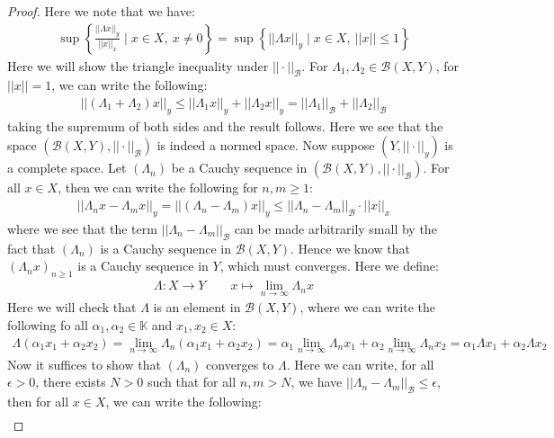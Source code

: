 \documentclass[11pt]{book}
\theoremstyle{break}
\theoremstyle{break}
\begin{document}
\begin{proof}
Here we note that we have:
\begin{align*}
\sup\left\{\frac{||\Lambda x||_y}{||x||_x}\mid x \in X, \ x\neq 0 \right\}  = \sup\left\{||\Lambda x||_y\mid x \in X, \ ||x||\leq 1 \right\}
\end{align*}
Here we will show the triangle inequality under $||\cdot ||_{\mathcal{B}}$. For $\Lambda_1, \Lambda_2 \in \mathcal{B}(X,Y)$, for $||x||=1$, we can write the following:
\begin{align*}
||(\Lambda_1+\Lambda_2)x||_y \leq ||\Lambda_1 x||_y + ||\Lambda_2 x||_y  = ||\Lambda_1||_{\mathcal{B}} + ||\Lambda_2||_{\mathcal{B}}
\end{align*}
taking the supremum of both sides and the result follows. Here we see that the space $(\mathcal{B}(X,Y), ||\cdot ||_{\mathcal{B}})$ is indeed a normed space. Now suppose $(Y, ||\cdot ||_y)$ is a complete space. Let $(\Lambda_n)$ be a Cauchy sequence in $(\mathcal{B}(X,Y), ||\cdot ||_{\mathcal{B}})$. For all $x \in X$, then we can write the following for $n,m \geq 1$:
\begin{align*}
||\Lambda_n x - \Lambda_m x||_y  = ||(\Lambda_n - \Lambda_m) x||_y \leq ||\Lambda_n - \Lambda_m||_{\mathcal{B}} \cdot ||x||_x
\end{align*}
where we see that the term $||\Lambda_n - \Lambda_m||_{\mathcal{B}}$ can be made arbitrarily small by the fact that $(\Lambda_n)$ is a Cauchy sequence in $\mathcal{B}(X,Y)$. Hence we know that $(\Lambda_n x)_{n \geq 1}$ is a Cauchy sequence in $Y$, which must converges. Here we define:
\begin{align*}
\Lambda:X \to Y \qquad x\mapsto \lim_{n\to \infty}\Lambda_n x
\end{align*} 
Here we will check that $\Lambda$ is an element in $\mathcal{B}(X,Y)$, where we can write the following fo all $\alpha_1 ,\alpha_2 \in \mathbb{K}$ and $x_1,x_2 \in X$:
\begin{align*}
\Lambda(\alpha_1 x_1 + \alpha_2 x_2 )  = \lim_{n\to \infty}\Lambda_n(\alpha_1 x_1 + \alpha_2x_2) = \alpha_1 \lim_{n\to \infty} \Lambda_n x_1 + \alpha_2 \lim_{n\to \infty}\Lambda_n x_2 = \alpha_1 \Lambda x_1 + \alpha_2 \Lambda x_2
\end{align*}
Now it suffices to show that $(\Lambda_n)$ converges to $\Lambda$. Here we can write, for all $\epsilon>0$, there exists $N >0$ such that for all $n,m >N$, we have $||\Lambda_n - \Lambda_m||_{\mathcal{B}} \leq \epsilon$, then for all $x \in X$, we can write the following:
\begin{align*}

\end{align*}
\end{proof}
\end{document}

